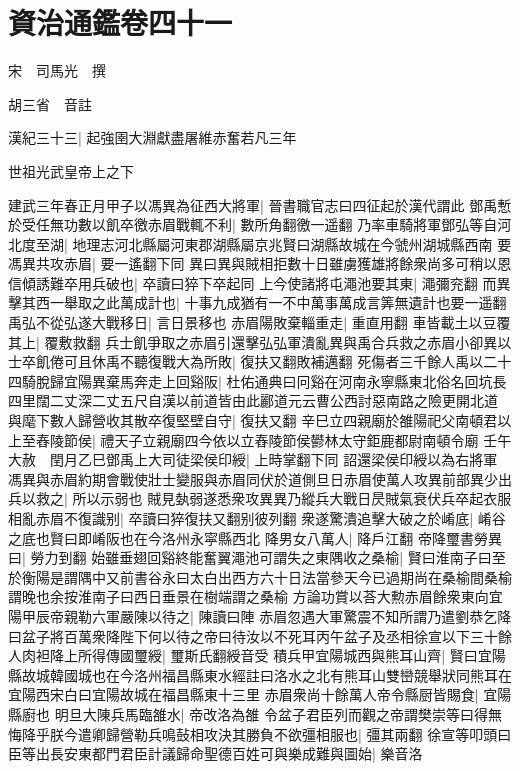 \section{資治通鑑卷四十一}
宋　司馬光　撰

胡三省　音註

漢紀三十三|{
	起強圉大淵獻盡屠維赤奮若凡三年}


世祖光武皇帝上之下

建武三年春正月甲子以馮異為征西大將軍|{
	晉書職官志曰四征起於漢代謂此}
鄧禹慙於受任無功數以飢卒徼赤眉戰輒不利|{
	數所角翻徼一遥翻}
乃率車騎將軍鄧弘等自河北度至湖|{
	地理志河北縣屬河東郡湖縣屬京兆賢曰湖縣故城在今虢州湖城縣西南}
要馮異共攻赤眉|{
	要一遙翻下同}
異曰異與賊相拒數十日雖虜獲雄將餘衆尚多可稍以恩信傾誘難卒用兵破也|{
	卒讀曰猝下卒起同}
上今使諸將屯澠池要其東|{
	澠彌兖翻}
而異擊其西一舉取之此萬成計也|{
	十事九成猶有一不中萬事萬成言筭無遺計也要一遥翻}
禹弘不從弘遂大戰移日|{
	言日景移也}
赤眉陽敗棄輜重走|{
	重直用翻}
車皆載土以豆覆其上|{
	覆敷救翻}
兵士飢爭取之赤眉引還擊弘弘軍潰亂異與禹合兵救之赤眉小卻異以士卒飢倦可且休禹不聽復戰大為所敗|{
	復扶又翻敗補邁翻}
死傷者三千餘人禹以二十四騎脫歸宜陽異棄馬奔走上回谿阪|{
	杜佑通典曰冋谿在河南永寧縣東北俗名回坑長四里闊二丈深二丈五尺自漢以前道皆由此酈道元云曹公西討惡南路之險更開北道}
與麾下數人歸營收其散卒復堅壁自守|{
	復扶又翻}
辛巳立四親廟於雒陽祀父南頓君以上至舂陵節侯|{
	禮天子立親廟四今依以立舂陵節侯鬰林太守鉅鹿都尉南頓令廟}
壬午大赦　閏月乙巳鄧禹上大司徒梁侯印綬|{
	上時掌翻下同}
詔還梁侯印綬以為右將軍　馮異與赤眉約期會戰使壯士變服與赤眉同伏於道側旦日赤眉使萬人攻異前部異少出兵以救之|{
	所以示弱也}
賊見埶弱遂悉衆攻異異乃縱兵大戰日昃賊氣衰伏兵卒起衣服相亂赤眉不復識别|{
	卒讀曰猝復扶又翻别彼列翻}
衆遂驚潰追擊大破之於崤底|{
	崤谷之底也賢曰即崤阪也在今洛州永寜縣西北}
降男女八萬人|{
	降戶江翻}
帝降璽書勞異曰|{
	勞力到翻}
始雖垂翅回谿終能奮翼澠池可謂失之東隅收之桑榆|{
	賢曰淮南子曰至於衡陽是謂隅中又前書谷永曰太白出西方六十日法當參天今已過期尚在桑榆間桑榆謂晚也余按淮南子曰西日垂景在樹端謂之桑榆}
方論功賞以荅大勲赤眉餘衆東向宜陽甲辰帝親勒六軍嚴陳以待之|{
	陳讀曰陣}
赤眉忽遇大軍驚震不知所謂乃遣劉恭乞降曰盆子將百萬衆降陛下何以待之帝曰待汝以不死耳丙午盆子及丞相徐宣以下三十餘人肉袒降上所得傳國璽綬|{
	璽斯氏翻綬音受}
積兵甲宜陽城西與熊耳山齊|{
	賢曰宜陽縣故城韓國城也在今洛州福昌縣東水經註曰洛水之北有熊耳山雙巒競舉狀同熊耳在宜陽西宋白曰宜陽故城在福昌縣東十三里}
赤眉衆尚十餘萬人帝令縣厨皆賜食|{
	宜陽縣廚也}
明旦大陳兵馬臨雒水|{
	帝改洛為雒}
令盆子君臣列而觀之帝謂樊崇等曰得無悔降乎朕今遣卿歸營勒兵鳴鼔相攻決其勝負不欲彊相服也|{
	彊其兩翻}
徐宣等叩頭曰臣等出長安東都門君臣計議歸命聖德百姓可與樂成難與圖始|{
	樂音洛}
